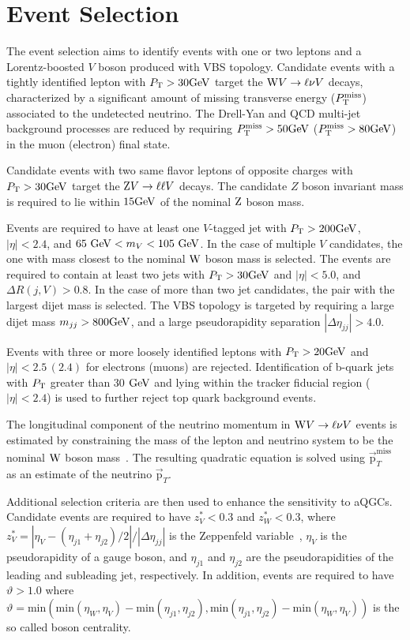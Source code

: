 
\section{Event Selection} %
\label{sec:event_selection}
The event selection aims to identify events with one or two leptons and a Lorentz-boosted $V$ boson produced with VBS topology. Candidate events with a tightly identified lepton with $P_\mathrm{T}>30\mathrm{GeV}$ target the $\mathrm{W} V \rightarrow \ell \nu V$ decays, characterized by a significant amount of missing transverse energy ($P_\mathrm{T}^{\mathrm{miss}}$) associated to the undetected neutrino. The Drell-Yan and QCD multi-jet background processes are reduced by requiring $P_\mathrm{T}^{\mathrm{miss}}>50\mathrm{GeV}$ ($P_\mathrm{T}^{\mathrm{miss}}>80\mathrm{GeV}$) in the muon (electron) final state. 

Candidate events with two same flavor leptons of opposite charges with  $P_\mathrm{T}>30\mathrm{GeV}$ target the  $\mathrm{Z} V \rightarrow \ell \ell V$ decays. The candidate $Z$ boson invariant mass is required to lie within $15\mathrm{GeV}$ of the nominal $\mathrm{Z}$ boson mass.

Events are required to have at least one $V$-tagged jet with $P_\mathrm{T}>200\mathrm{GeV}$, $|\eta|<2.4$, and $65~\mathrm{GeV} < m_{V} < 105~\mathrm{GeV}$. In the case of multiple $V$ candidates, the one with mass closest to the nominal $\mathrm{W}$ boson mass is selected.  The events are required to contain at least two jets with $P_\mathrm{T}>30\mathrm{GeV}$ and $|\eta|<5.0$, and $\Delta R(j,V)>0.8$. In the case of more than two jet candidates, the pair with the largest dijet mass is selected. The VBS topology is targeted by requiring a large dijet mass $m_{jj}>800\mathrm{GeV}$, and a large pseudorapidity separation $|\Delta \eta_{jj}|>4.0$.  

Events with three or more loosely identified leptons with $P_\mathrm{T}>20\mathrm{GeV}$ and $|\eta|<2.5\,(2.4)$ for electrons (muons) are rejected. Identification of b-quark jets with $P_\mathrm{T}$ greater than 30 $\mathrm{GeV}$ and lying within the tracker fiducial region ($\left|\eta\right|<2.4$)  is used to further reject top quark background events.   

The longitudinal component of the neutrino momentum in $\mathrm{W} V \rightarrow \ell \nu V$ events is estimated by constraining the mass of the lepton and neutrino system to be the nominal $\mathrm{W}$ boson mass~\cite{Sirunyan:2018iff}. The resulting quadratic equation is solved using $\vec{\mathrm{p}}_{T}^{\mathrm{miss}}$ as an estimate of the neutrino $\vec{\mathrm{p}}_{T}$.

Additional selection criteria are then used to enhance the sensitivity to aQGCs. Candidate events are required to have  $z_{V}^{*} < 0.3$ and $z_{W}^{*} < 0.3$, where $z_{V}^{*} = |\eta_{V}-(\eta_{j1}+\eta_{j2})/2|/|\Delta \eta_{jj}|$ is the Zeppenfeld variable~\cite{Rainwater:1996ud}, $\eta_{V}$ is the
pseudorapidity of a gauge boson, and $\eta_{j1}$ and $\eta_{j2}$ are the pseudorapidities of the leading and subleading jet, respectively. In addition, events are required to have $\vartheta>1.0$ where $\vartheta = \mathrm{min}(\mathrm{min}(\eta_{W},\eta_{V})-\mathrm{min}(\eta_{j1},\eta_{j2}),\mathrm{min}(\eta_{j1},\eta_{j2})-\mathrm{min}(\eta_{W},\eta_{V}))$ is the so called boson centrality. 

